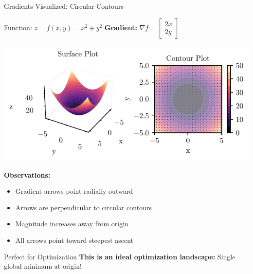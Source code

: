 \documentclass[10pt]{beamer}
\newcommand{\fitpic}[1]{\begin{adjustbox}{max width=\linewidth, max totalheight=0.78\textheight}#1\end{adjustbox}}
\begin{document}
\begin{frame}{Gradients Visualized: Circular Contours}
\begin{examplebox}{Function: $z = f(x,y) = x^{2} + y^{2}$}
\textbf{Gradient:} $\nabla f = \begin{bmatrix} 2x \\ 2y \end{bmatrix}$
\end{examplebox}

\begin{center}
\fitpic{\includegraphics[width=0.8\linewidth]{../assets/mathematical-ml/figures/contour-x_squared_plus_y_squared-with-gradient.pdf}}
\end{center}

\begin{keypointsbox}
\textbf{Observations:}
\begin{itemize}
\item Gradient arrows point radially outward
\item Arrows are perpendicular to circular contours
\item Magnitude increases away from origin
\item All arrows point toward steepest ascent
\end{itemize}
\end{keypointsbox}

\begin{alertbox}{Perfect for Optimization}
\textbf{This is an ideal optimization landscape:} Single global minimum at origin!
\end{alertbox}
\end{frame}
\end{document}
